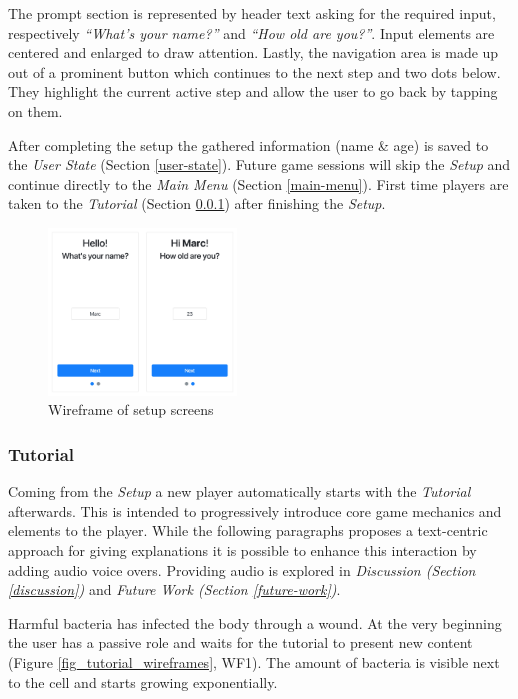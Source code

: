 The prompt section is represented by header text asking for the required input, respectively \textit{\enquote{What's your name?}} and \textit{\enquote{How old are you?}}. Input elements are centered and enlarged to draw attention. Lastly, the navigation area is made up out of a prominent button which continues to the next step and two dots below. They highlight the current active step and allow the user to go back by tapping on them.

After completing the setup the gathered information (name \& age) is saved to the \textit{User State} (Section \ref{user-state}). Future game sessions will skip the \textit{Setup} and continue directly to the \textit{Main Menu} (Section \ref{main-menu}). First time players are taken to the \textit{Tutorial} (Section \ref{tutorial}) after finishing the \textit{Setup}.

\begin{figure}[H]
  \includegraphics[width=5cm]{assets/mockup_setup_combined.jpg}
  \caption{Wireframe of setup screens}
  \centering
  \label{fig_setup}
\end{figure}

\subsubsection{Tutorial} \label{tutorial}
Coming from the \textit{Setup} a new player automatically starts with the \textit{Tutorial} afterwards. This is intended to progressively introduce core game mechanics and elements to the player. While the following paragraphs proposes a text-centric approach for giving explanations it is possible to enhance this interaction by adding audio voice overs. Providing audio is explored in \textit{Discussion (Section \ref{discussion})} and \textit{Future Work (Section \ref{future-work})}.

Harmful bacteria has infected the body through a wound. At the very beginning the user has a passive role and waits for the tutorial to present new content (Figure \ref{fig_tutorial_wireframes}, WF1).
The amount of bacteria is visible next to the cell and starts growing exponentially.

